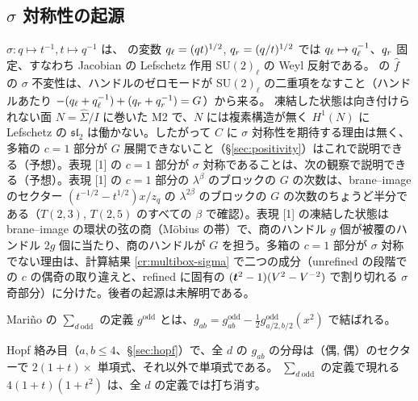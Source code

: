 \subsection{$\sigma$ 対称性の起源}
$\sigma\colon q\mapsto t^{-1}, t\mapsto q^{-1}$ は、\cite{KN17} の変数 $q_\ell = (qt)^{1/2}$, $q_r = (q/t)^{1/2}$ では $q_\ell \mapsto q_\ell^{-1}$、$q_r$ 固定、すなわち Jacobian の Lefschetz 作用 SU$(2)_\ell$ の Weyl 反射である。
\cite{KN17} の $\hat f$ の $\sigma$ 不変性は、ハンドルのゼロモードが SU$(2)_\ell$ の二重項をなすこと（ハンドルあたり $-(q_\ell + q_\ell^{-1}) + (q_r + q_r^{-1}) = G$）から来る。
凍結した状態は向き付けられない面 $N = \hat\Sigma/I$ に巻いた M2 で、$N$ には複素構造が無く $H^1(N)$ に Lefschetz の $\mathfrak{sl}_2$ は働かない。したがって $C$ に $\sigma$ 対称性を期待する理由は無く、多箱の $c = 1$ 部分が $G$ 展開できないこと（§\ref{sec:positivity}）はこれで説明できる（予想）。表現 [1] の $c = 1$ 部分が $\sigma$ 対称であることは、次の観察で説明できる（予想）。表現 [1] の $c = 1$ 部分の $\lambda^\beta$ のブロックの $G$ の次数は、brane--image のセクター $(t^{-1/2}-t^{1/2})x/z_q$ の $\lambda^{2\beta}$ のブロックの $G$ の次数のちょうど半分である（$T(2,3)$, $T(2,5)$ のすべての $\beta$ で確認）。表現 [1] の凍結した状態は brane--image の環状の弦の商（Möbius の帯）で、商のハンドル $g$ 個が被覆のハンドル $2g$ 個に当たり、商のハンドルが $G$ を担う。多箱の $c = 1$ 部分が $\sigma$ 対称でない理由は、計算結果 \ref{cr:multibox-sigma} で二つの成分（unrefined の段階での $c$ の偶奇の取り違えと、refined に固有の $(\bm{t}^2-1)(V^2-V^{-2})$ で割り切れる $\sigma$ 奇部分）に分けた。後者の起源は未解明である。

Mariño の $\sum_{d\ \mathrm{odd}}$ の定義 $g^{\mathrm{odd}}$ とは、$g_{ab} = g^{\mathrm{odd}}_{ab} - \tfrac12 g^{\mathrm{odd}}_{a/2, b/2}(x^2)$ で結ばれる。

\begin{compresult}
Hopf 絡み目（$a, b \le 4$、§\ref{sec:hopf}）で、全 $d$ の $g_{ab}$ の分母は（偶, 偶）のセクターで $2(1+t)\times$ 単項式、それ以外で単項式である。
$\sum_{d\ \mathrm{odd}}$ の定義で現れる $4(1+t)(1+t^2)$ は、全 $d$ の定義では打ち消す。
\end{compresult}

